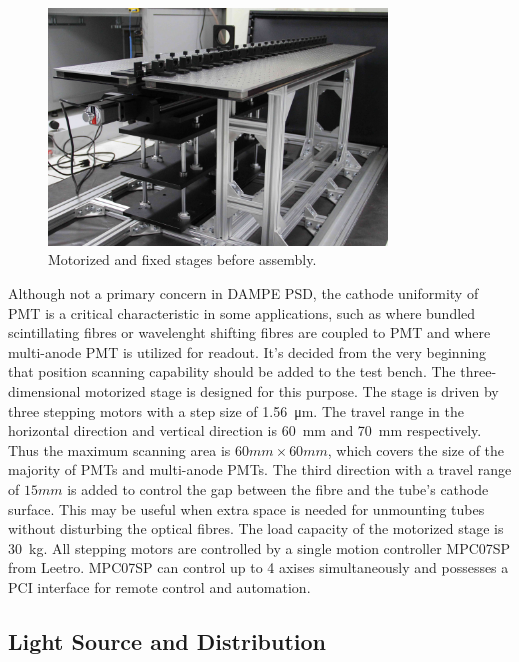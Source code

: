 \documentclass[5p, times]{elsarticle}
\begin{document}
\begin{figure}[h!]
 \centering
 \includegraphics[width=90mm]{stage1_crop}
\caption{Motorized and fixed stages before assembly.}
\label{fig:stages}
\end{figure} 

Although not a primary concern in DAMPE PSD, the cathode uniformity of PMT is a critical characteristic in some applications, such as where bundled scintillating fibres or wavelenght shifting fibres are coupled to PMT and where multi-anode PMT is utilized for readout.
It's decided from the very beginning that position scanning capability should be added to the test bench.
The three-dimensional motorized stage is designed for this purpose.
The stage is driven by three stepping motors with a step size of \SI{1.56}{\micro\meter}.
The travel range in the horizontal direction and vertical direction is \SI{60}{\milli\meter} and \SI{70}{\milli\meter} respectively.
Thus the maximum scanning area is $60mm\times60mm$, which covers the size of the majority of PMTs and multi-anode PMTs.
The third direction with a travel range of $15mm$ is added to control the gap between the fibre and the tube's cathode surface.
This may be useful when extra space is needed for unmounting tubes without disturbing the optical fibres. 
The load capacity of the motorized stage is \SI{30}{\kilo\gram}.
All stepping motors are controlled by a single motion controller MPC07SP from Leetro.
MPC07SP can control up to 4 axises simultaneously and possesses a PCI interface for remote control and automation.

\subsection{Light Source and Distribution}
\label{sec:light_source}
\end{document}
